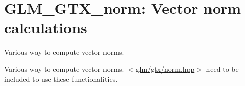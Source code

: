 \hypertarget{group__gtx__norm}{\section{\-G\-L\-M\-\_\-\-G\-T\-X\-\_\-norm\-: \-Vector norm calculations}
\label{group__gtx__norm}
}


\-Various way to compute vector norms.  


\-Various way to compute vector norms. $<$\hyperlink{norm_8hpp}{glm/gtx/norm.\-hpp}$>$ need to be included to use these functionalities. 